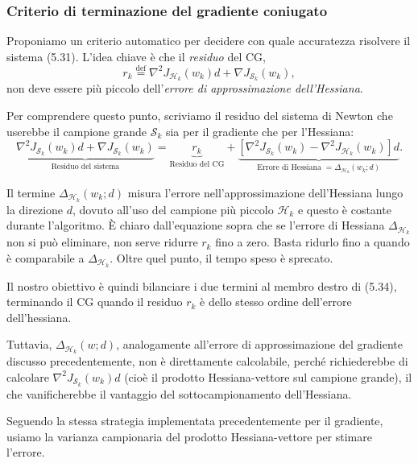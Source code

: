 \documentclass[a4paper,12pt]{article}
\numberwithin{equation}{section}
\numberwithin{figure}{section}
\numberwithin{table}{section}
\begin{document}
\subsubsection{Criterio di terminazione del gradiente coniugato}

Proponiamo un criterio automatico per decidere con quale accuratezza risolvere il sistema (5.31). L'idea chiave è che il \emph{residuo} del CG,
\[
r_k \stackrel{\mathrm{def}}{=} \nabla^2 J_{\mathcal{H}_k}(w_k) d + \nabla J_{\mathcal{S}_k}(w_k), \tag{5.33}
\]
non deve essere più piccolo dell'\emph{errore di approssimazione dell'Hessiana}.

Per comprendere questo punto, scriviamo il residuo del sistema di Newton che userebbe il campione grande \(\mathcal{S}_k\) sia per il gradiente che per l'Hessiana:
\[
\underbrace{\nabla^2 J_{\mathcal{S}_k}(w_k) d + \nabla J_{\mathcal{S}_k}(w_k)}_{\text{Residuo del sistema}}
= \underbrace{r_k}_{\text{Residuo del CG}} + \underbrace{\left[\nabla^2 J_{\mathcal{S}_k}(w_k) - \nabla^2 J_{\mathcal{H}_k}(w_k)\right] d}_{\text{Errore di Hessiana }= \Delta_{\mathcal{H}_k}(w_k; d)}. \tag{5.34}
\]

Il termine \(\Delta_{\mathcal{H}_k}(w_k; d)\) misura l'errore nell'approssimazione dell'Hessiana lungo la direzione \(d\), dovuto all'uso del campione più piccolo \(\mathcal{H}_k\) e questo è costante durante l'algoritmo. È chiaro dall'equazione sopra che se l'errore di Hessiana \(\Delta_{\mathcal{H}_k}\) non si può eliminare, non serve ridurre \(r_k\) fino a zero. Basta ridurlo fino a quando è comparabile a \(\Delta_{\mathcal{H}_k}\). Oltre quel punto, il tempo speso è sprecato.

Il nostro obiettivo è quindi bilanciare i due termini al membro destro di (5.34), terminando il CG quando il residuo \(r_k\) è dello stesso ordine dell'errore dell'hessiana.

Tuttavia, \(\Delta_{\mathcal{H}_k}(w; d)\), analogamente all'errore di approssimazione del gradiente discusso precedentemente, non è direttamente calcolabile, perché richiederebbe di calcolare \(\nabla^2 J_{\mathcal{S}_k}(w_k)d\) (cioè il prodotto Hessiana-vettore sul campione grande), il che vanificherebbe il vantaggio del sottocampionamento dell'Hessiana.

Seguendo la stessa strategia implementata precedentemente per il gradiente, usiamo la varianza campionaria del prodotto Hessiana-vettore per stimare l'errore. 
\end{document}
